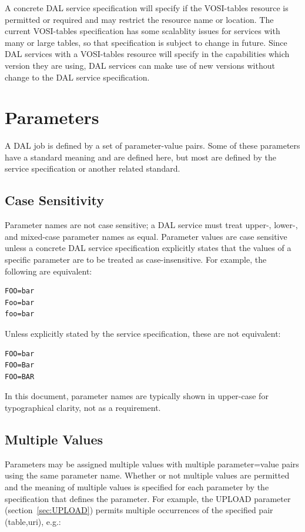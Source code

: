 \documentclass[11pt,letter]{ivoa}
\begin{document}
A concrete DAL service specification will specify if the VOSI-tables resource is 
permitted or required and may restrict the resource name or location.
The current VOSI-tables specification has some scalablity 
issues for services with many or large tables, so that specification is subject 
to change in future. Since DAL services with a VOSI-tables resource will specify 
in the capabilities which version they are using, DAL services can make use of 
new versions without change to the DAL service specification.

\section{Parameters}
\label{sec:parameters}
A DAL job is defined by a set of parameter-value pairs. Some of these parameters 
have a standard meaning and are defined here, but most are defined by the 
service specification or another related standard. 

\subsection{Case Sensitivity}
Parameter names are not case sensitive; a DAL service must treat
\hbox{upper-,} \hbox{lower-,} 
and mixed-case parameter names as equal. Parameter values are case sensitive 
unless a concrete DAL service specification explicitly states that the values of 
a specific parameter are to be treated as case-insensitive. For example, the 
following are equivalent:

\begin{verbatim}
FOO=bar
Foo=bar
foo=bar
\end{verbatim}

Unless explicitly stated by the service specification, these are not equivalent:

\begin{verbatim}
FOO=bar
FOO=Bar
FOO=BAR
\end{verbatim}

In this document, parameter names are typically shown in upper-case for 
typographical clarity, not as a requirement.

\subsection{Multiple Values}
Parameters may be assigned multiple values with multiple parameter=value pairs 
using the same parameter name. Whether or not multiple values are permitted and 
the meaning of multiple values is specified for each parameter by the 
specification that defines the parameter. For example, the UPLOAD parameter 
(section~\ref{sec:UPLOAD}) permits multiple occurrences of the specified 
pair (table,uri), e.g.:
\end{document}
